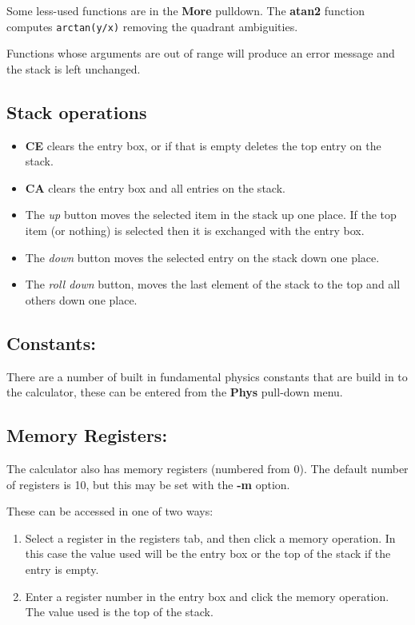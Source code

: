 \documentclass{article}
\begin{document}
  Some less-used functions are in the \textbf{More} pulldown. The
  \textbf{atan2} function computes \texttt{arctan(y/x)} removing the
  quadrant ambiguities.

  Functions whose arguments are out of range will produce an error
  message and the stack is left unchanged.

  \subsection{Stack operations}

  \begin{itemize}
  \item \textbf{CE} clears the entry box, or if that is empty deletes
    the top entry on the stack.

  \item \textbf{CA} clears the entry box and all entries on the stack.

  \item The \emph{up} button moves the selected item in the stack up
    one place. If the top item (or nothing) is selected then it is
    exchanged with the entry box.

  \item The \emph{down} button moves the selected entry on the stack
    down one place.

  \item The \emph{roll down} button, moves the last element of the
    stack to the top and all others down one place.
  \end{itemize}

  \subsection{Constants:}

  There are a number of built in fundamental physics constants that are
  build in to the calculator, these can be entered from the
  \textbf{Phys} pull-down menu.

  \subsection{Memory Registers:}

  The calculator also has memory registers (numbered from 0). The
  default number of registers is 10, but this may be set with the
  \textbf{-m} option.

  These can be accessed in one of two ways:
  \begin{enumerate}
  \item Select a register in the registers tab, and then click a memory
    operation. In this case the value used will be the entry box or the
    top of the stack if the entry is empty.
  \item Enter a register number in the entry box and click the memory
    operation. The value used is the top of the stack.
  \end{enumerate}
\end{document}
